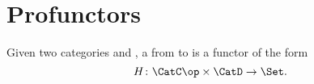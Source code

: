 

\section{Profunctors}

\begin{ctdefinition}[Profunctor]
  \label{def:profunctor}
  Given two categories \CatC and \CatD, a \emph{} from \CatC to \CatD is a functor of the form
  \begin{equation}
    H\colon \CatC\op \times \CatD \to \Set.
  \end{equation}
\end{ctdefinition}

